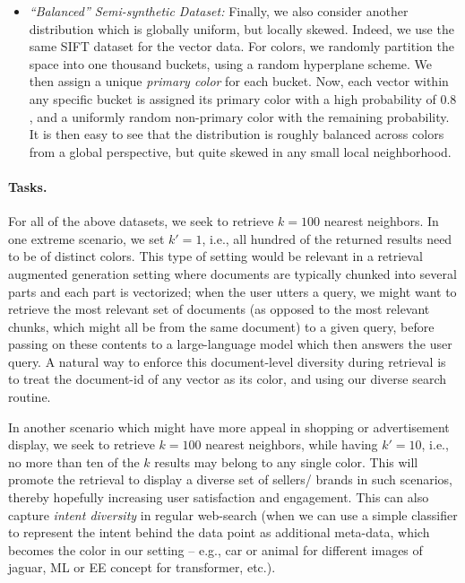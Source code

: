 \begin{itemize}[leftmargin=*]
\item{\em ``Balanced'' Semi-synthetic Dataset:} Finally, we also consider another distribution which is globally uniform, but locally skewed. Indeed, we use the same SIFT dataset for the vector data. For colors, we randomly partition the space into one thousand buckets, using a random hyperplane scheme. We then assign a unique \emph{primary color} for each bucket. Now, each vector within any specific bucket is assigned its primary color with a high probability of $0.8$, and a uniformly random non-primary color with the remaining probability. It is then easy to see that the distribution is roughly balanced across colors from a global perspective, but quite skewed in any small local neighborhood.
\end{itemize}

\paragraph{Tasks.}
For all of the above datasets, we seek to retrieve $k=100$ nearest neighbors. In one extreme scenario, we set $k'=1$, i.e., all hundred of the returned results need to be of distinct colors. This type of setting would be relevant in a retrieval augmented generation setting where documents are typically chunked into several parts and each part is vectorized; when the user utters a query, we might want to retrieve the most relevant set of documents (as opposed to the most relevant chunks, which might all be from the same document) to a given query, before passing on these contents to a large-language model which then answers the user query. A natural way to enforce this document-level diversity during retrieval is to treat the document-id of any vector as its color, and using our diverse search routine.

In another scenario which might have more appeal in shopping or advertisement display, we seek to retrieve $k=100$ nearest neighbors, while having $k'=10$, i.e., no more than ten of the $k$ results may belong to any single color. This will promote the retrieval to display a diverse set of sellers/ brands in such scenarios, thereby hopefully increasing user satisfaction and engagement. This can also capture \emph{intent diversity} in regular web-search (when we can use a simple classifier to represent the intent behind the data point as additional meta-data, which becomes the color in our setting -- e.g., car or animal for different images of jaguar, ML or EE concept for transformer, etc.). 


